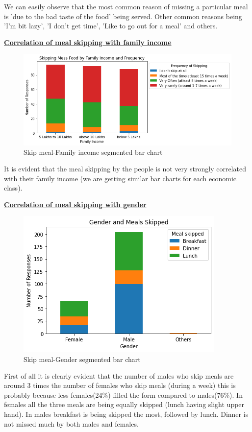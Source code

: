 \documentclass{article}
\begin{document}
We can easily observe that the most common reason of missing a particular meal is 'due to the bad taste of the food' being served. Other common reasons being 'I'm bit lazy', 'I don't get time', 'Like to go out for a meal' and others.\\
\centerline{\underline{\bfseries{Correlation of meal skipping with family income}}}
\begin{figure}[H]
    \centering
    \includegraphics[scale = 0.8]{Meal Skipping - Family Income Seg chart.png}
    \caption{Skip meal-Family income segmented bar chart}  
    \label{fig:Meal Skipping - Family Income Seg chart}
\end{figure}
It is evident that the meal skipping by the people is not very strongly correlated with their family income (we are getting similar bar charts for each economic class).\\
\centerline{\underline{\bfseries{Correlation of meal skipping with gender}}}
\begin{figure}[H]
    \centering
    \includegraphics[scale = 0.8]{Meal Skipping - Gender Seg chart.png}
    \caption{Skip meal-Gender segmented bar chart}  
    \label{fig:Meal Skipping - Gender Seg chart}
\end{figure}
First of all it is clearly evident that the number of males who skip meals are around 3 times the number of females who skip meals (during a week) this is probably because less females(24\%) filled the form compared to males(76\%). In females all the three meals are being equally skipped (lunch having slight upper hand). In males breakfast is being skipped the most, followed by lunch. Dinner is not missed much by both males and females.\\
\pagebreak
\end{document}
